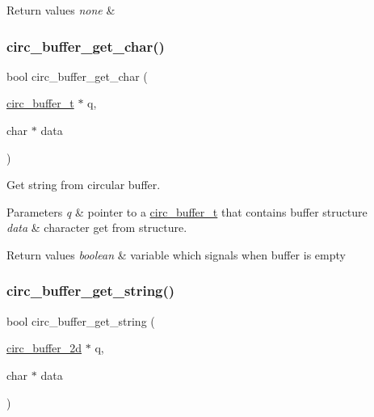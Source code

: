 \begin{DoxyRetVals}{Return values}
{\em none} & \\
\hline
\end{DoxyRetVals}
\mbox{\label{group___buffer___functions_ga28f5578f75c7960a29b69026b32b6c49}} 
\subsubsection{\texorpdfstring{circ\+\_\+buffer\+\_\+get\+\_\+char()}{circ\_buffer\_get\_char()}}
{\footnotesize\ttfamily bool circ\+\_\+buffer\+\_\+get\+\_\+char (\begin{DoxyParamCaption}\item[{\hyperlink{structcirc__buffer__t}{circ\+\_\+buffer\+\_\+t} $\ast$}]{q,  }\item[{char $\ast$}]{data }\end{DoxyParamCaption})}



Get string from circular buffer. 


\begin{DoxyParams}{Parameters}
{\em q} & pointer to a \hyperlink{structcirc__buffer__t}{circ\+\_\+buffer\+\_\+t} that contains buffer structure \\
\hline
{\em data} & character get from structure. \\
\hline
\end{DoxyParams}

\begin{DoxyRetVals}{Return values}
{\em boolean} & variable which signals when buffer is empty \\
\hline
\end{DoxyRetVals}
\mbox{\label{group___buffer___functions_gad2d60d48e2479f41e8d4e6eedba774a1}} 
\subsubsection{\texorpdfstring{circ\+\_\+buffer\+\_\+get\+\_\+string()}{circ\_buffer\_get\_string()}}
{\footnotesize\ttfamily bool circ\+\_\+buffer\+\_\+get\+\_\+string (\begin{DoxyParamCaption}\item[{\hyperlink{structcirc__buffer__2d}{circ\+\_\+buffer\+\_\+2d} $\ast$}]{q,  }\item[{char $\ast$}]{data }\end{DoxyParamCaption})}



